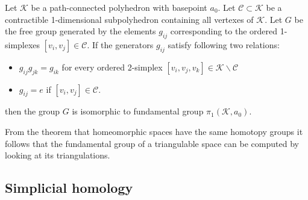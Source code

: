 	
	\begin{theorem}
		Let $\mathcal{K}$ be a path-connected polyhedron with basepoint $a_0$. Let $\mathcal{C}\subset\mathcal{K}$ be a contractible 1-dimensional subpolyhedron containing all vertexes of $\mathcal{K}$. Let $G$ be the free group generated by the elements $g_{ij}$ corresponding to the ordered 1-simplexes $[v_i,v_j]\in\mathcal{C}$. If the generators $g_{ij}$ satisfy following two relations:
		\begin{itemize}
			\item $g_{ij}g_{jk} = g_{ik}$ for every ordered 2-simplex $[v_i,v_j,v_k]\in\mathcal{K}\backslash\mathcal{C}$
			\item $g_{ij} = e$ if $[v_i,v_j]\in\mathcal{C}$.
		\end{itemize}
		then the group $G$ is isomorphic to fundamental group $\pi_1(\mathcal{K}, a_0)$.
	\end{theorem}
	\begin{result}
		From the theorem that homeomorphic spaces have the same homotopy groups it follows that the fundamental group of a triangulable space can be computed by looking at its triangulations.
	\end{result}

\subsection{Simplicial homology}	
	
